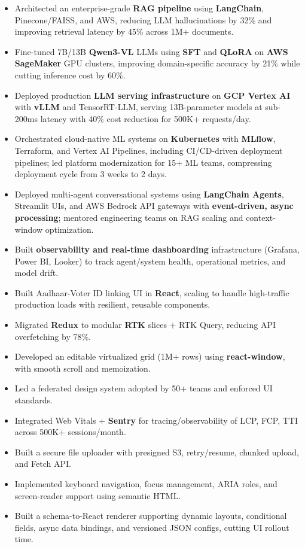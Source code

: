 \documentclass[100pt,a4paper]{article}
\begin{document}
\begin{itemize}
\vspace{2pt}
\item {Architected an enterprise-grade \textbf{RAG pipeline} using \textbf{LangChain}, Pinecone/FAISS, and AWS, reducing LLM hallucinations by 32\% and improving retrieval latency by 45\% across 1M+ documents.}
\item {Fine-tuned 7B/13B \textbf{Qwen3-VL} LLMs using \textbf{SFT} and \textbf{QLoRA} on \textbf{AWS SageMaker} GPU clusters, improving domain-specific accuracy by 21\% while cutting inference cost by 60\%.}
\item {Deployed production \textbf{LLM serving infrastructure} on \textbf{GCP Vertex AI} with \textbf{vLLM} and TensorRT-LLM, serving 13B-parameter models at sub-200ms latency with 40\% cost reduction for 500K+ requests/day.}
\item {Orchestrated cloud-native ML systems on \textbf{Kubernetes} with \textbf{MLflow}, Terraform, and Vertex AI Pipelines, including CI/CD-driven deployment pipelines; led platform modernization for 15+ ML teams, compressing deployment cycle from 3 weeks to 2 days.}
\item {Deployed multi-agent conversational systems using \textbf{LangChain Agents}, Streamlit UIs, and AWS Bedrock API gateways with \textbf{event-driven, async processing}; mentored engineering teams on RAG scaling and context-window optimization.}
\item {Built \textbf{observability and real-time dashboarding} infrastructure (Grafana, Power BI, Looker) to track agent/system health, operational metrics, and model drift.}
\item {Built Aadhaar-Voter ID linking UI in \textbf{React}, scaling to handle high-traffic production loads with resilient, reusable components.}
\item {Migrated \textbf{Redux} to modular \textbf{RTK} slices + RTK Query, reducing API overfetching by 78\%.}
\item {Developed an editable virtualized grid (1M+ rows) using \textbf{react-window}, with smooth scroll and memoization.}
\item {Led a federated design system adopted by 50+ teams and enforced UI standards.}
\item {Integrated Web Vitals + \textbf{Sentry} for tracing/observability of LCP, FCP, TTI across 500K+ sessions/month.}
\item {Built a secure file uploader with presigned S3, retry/resume, chunked upload, and Fetch API.}
\item {Implemented keyboard navigation, focus management, ARIA roles, and screen-reader support using semantic HTML.}
\item {Built a schema-to-React renderer supporting dynamic layouts, conditional fields, async data bindings, and versioned JSON configs, cutting UI rollout time.}
\end{itemize}
\end{document}
